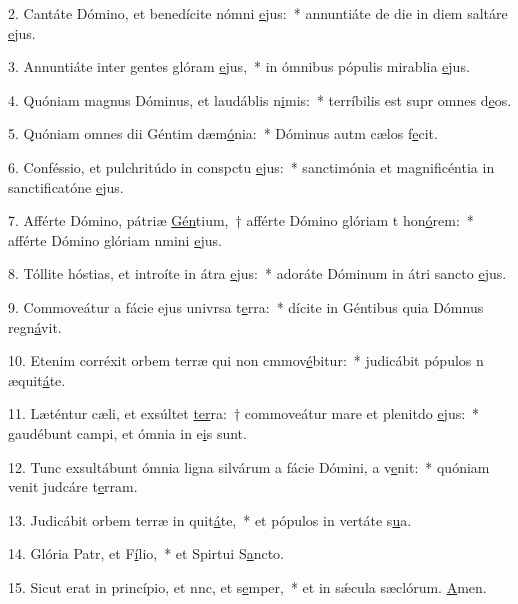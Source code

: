 2. Cantáte Dómino, et benedícite nómni \uline{e}jus:~* annuntiáte de die in diem saltáre \uline{e}jus.\par 
3. Annuntiáte inter gentes glóram \uline{e}jus,~* in ómnibus pópulis mirablia \uline{e}jus.\par 
4. Quóniam magnus Dóminus, et laudáblis n\uline{i}mis:~* terríbilis est supr omnes d\uline{e}os.\par 
5. Quóniam omnes dii Géntim dæm\uline{ó}nia:~* Dóminus autm cælos f\uline{e}cit.\par 
6. Conféssio, et pulchritúdo in conspctu \uline{e}jus:~* sanctimónia et magnificéntia in sanctificatóne \uline{e}jus.\par 
7. Afférte Dómino, pátriæ \uline{Gén}tium,~† afférte Dómino glóriam t hon\uline{ó}rem:~* afférte Dómino glóriam nmini \uline{e}jus.\par 
8. Tóllite hóstias, et introíte in átra \uline{e}jus:~* adoráte Dóminum in átri sancto \uline{e}jus.\par 
9. Commoveátur a fácie ejus univrsa t\uline{e}rra:~* dícite in Géntibus quia Dómnus regn\uline{á}vit.\par 
10. Etenim corréxit orbem terræ qui non cmmov\uline{é}bitur:~* judicábit pópulos n æquit\uline{á}te.\par 
11. Læténtur cæli, et exsúltet \uline{ter}ra:~† commoveátur mare et plenitdo \uline{e}jus:~* gaudébunt campi, et ómnia  in e\uline{i}s sunt.\par 
12. Tunc exsultábunt ómnia ligna silvárum a fácie Dómini, a v\uline{e}nit:~* quóniam venit judcáre t\uline{e}rram.\par 
13. Judicábit orbem terræ in quit\uline{á}te,~* et pópulos in vertáte s\uline{u}a.\par 
14. Glória Patr, et F\uline{í}lio,~* et Spirtui S\uline{a}ncto.\par 
15. Sicut erat in princípio, et nnc, et s\uline{e}mper,~* et in sǽcula sæclórum. \uline{A}men.\par 
